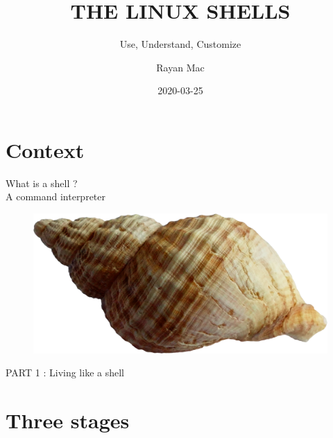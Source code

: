 \documentclass[aspectratio=169,10pt]{beamer}
\title{THE LINUX SHELLS}
\subtitle{Use, Understand, Customize}
\author[shortname]{Rayan Mac}
\date{2020-03-25}
\begin{document}

\begin{frame}
  \titlepage
\end{frame}

\section*{Context}


\begin{frame}[c]
    \begin{center}
        \huge What is a shell ?\\
        \pause
        \vspace{\baselineskip}
        \Large A command interpreter
        \vspace{\baselineskip}
        \begin{figure}[h]
            \includegraphics[scale=0.07]{./images/SeaShellOK}
        \end{figure}
    \end{center}
\end{frame}


%

\begin{frame}[c]
    \begin{center}
        \huge PART 1 : Living like a shell
    \end{center}
\end{frame}

\section{Three stages}
\end{document}
